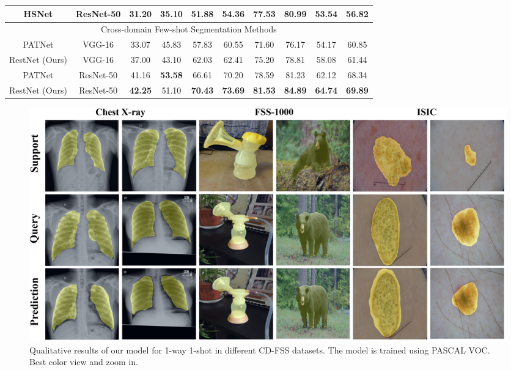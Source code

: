 \documentclass{bmvc2k}
\begin{document}
\begin{table}[t]
{\begin{tabular}{c|c|c|c|c|c|c|c|c|c}
HSNet \cite{min2021hypercorrelation} & ResNet-50                    & 31.20  & 35.10            & 51.88  & 54.36                   & 77.53  & 80.99               &53.54 &56.82              \\ 
\hline
\multicolumn{10}{c}{Cross-domain Few-shot Segmentation Methods}                                                                                                                   \\ 
\hline
PATNet \cite{lei2022cross} & VGG-16                    & 33.07  & 45.83            & 57.83  & 60.55                   & 71.60  & 76.17               &54.17
  &60.85             \\
RestNet (Ours)                    &       VGG-16                    &     37.00   &          43.10        &     62.03   &            62.41             &    75.20    &         78.81       &     58.08   &         61.44            \\
PATNet \cite{lei2022cross}                   & ResNet-50                    & 41.16  & \textbf{53.58}            & 66.61  & 70.20              & 78.59  & 81.23               & 62.12 & 68.34             \\
RestNet (Ours)                     &       ResNet-50                    &     \textbf{42.25}   &       51.10           &     \textbf{70.43}   &                \textbf{73.69}         &    \textbf{81.53}    &        \textbf{84.89}             &      \textbf{64.74} &      \textbf{69.89}       \\
\bottomrule
\end{tabular}
}
\vspace {-0.5cm}
\label{1111111}
\end{table}
\begin{figure}[t]
\centering
\includegraphics[scale=0.12]{images/vision.png}
\caption{Qualitative results of our model for 1-way 1-shot in different CD-FSS datasets. The model is trained using PASCAL VOC. Best color view and zoom in.}
\label{vision}
\end{figure}
\end{document}
